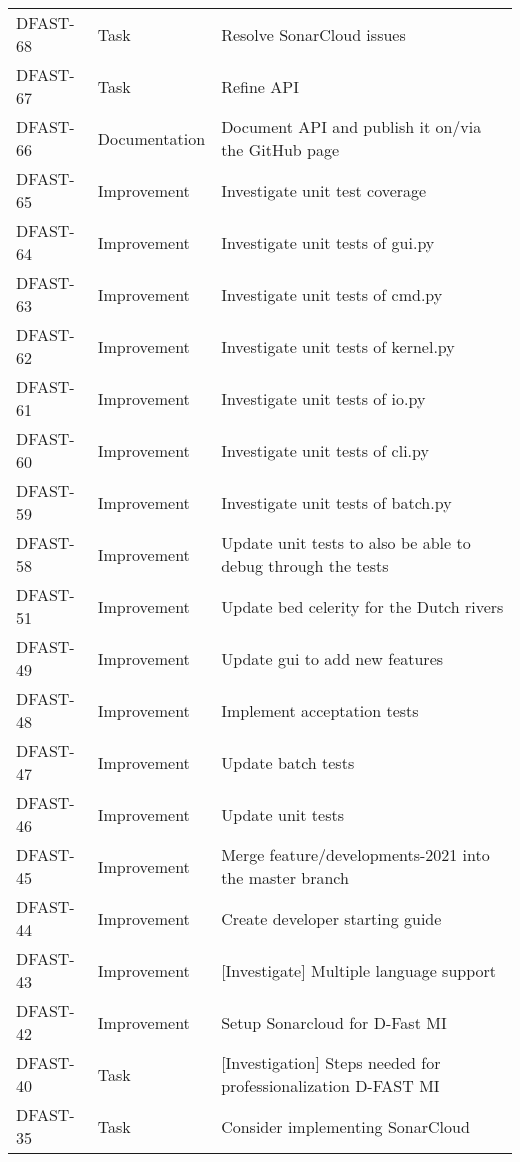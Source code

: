 \documentclass[git]{deltares_manual}
\begin{document}
\begin{longtable}{l|l|p{8cm}}
DFAST-68 & Task & Resolve SonarCloud issues \\
DFAST-67 & Task & Refine API \\
DFAST-66 & Documentation & Document API and publish it on/via the GitHub page \\
DFAST-65 & Improvement & Investigate unit test coverage \\
DFAST-64 & Improvement & Investigate unit tests of gui.py \\
DFAST-63 & Improvement & Investigate unit tests of cmd.py \\
DFAST-62 & Improvement & Investigate unit tests of kernel.py \\
DFAST-61 & Improvement & Investigate unit tests of io.py \\
DFAST-60 & Improvement &  Investigate unit tests of cli.py \\
DFAST-59 & Improvement & Investigate unit tests of batch.py \\
DFAST-58 & Improvement & Update unit tests to also be able to debug through the tests \\
DFAST-51 & Improvement & Update bed celerity for the Dutch rivers \\
DFAST-49 & Improvement & Update gui to add new features \\
DFAST-48 & Improvement & Implement acceptation tests \\
DFAST-47 & Improvement & Update batch tests \\
DFAST-46 & Improvement & Update unit tests \\
DFAST-45 & Improvement & Merge feature/developments-2021 into the master branch \\
DFAST-44 & Improvement & Create developer starting guide \\
DFAST-43 & Improvement & [Investigate] Multiple language support \\
DFAST-42 & Improvement & Setup Sonarcloud for D-Fast MI \\
DFAST-40 & Task & [Investigation] Steps needed for professionalization D-FAST MI \\
DFAST-35 & Task & Consider implementing SonarCloud  \\
\end{longtable}

\pagestyle{empty}
\cleardoublepage
\mbox{}
\end{document}
